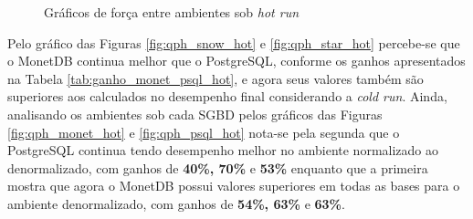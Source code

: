 \begin{figure}[t]
        \centering
        \caption{Gráficos de força entre ambientes sob \textit{hot run}}
        \label{fig:power_hot}
\end{figure}

Pelo gráfico das Figuras \ref{fig:qph_snow_hot} e \ref{fig:qph_star_hot} percebe-se que o MonetDB continua melhor que o PostgreSQL, conforme os ganhos apresentados na Tabela \ref{tab:ganho_monet_psql_hot}, e agora seus valores também são superiores aos calculados no desempenho final considerando a \textit{cold run}. Ainda, analisando os ambientes sob cada SGBD pelos gráficos das Figuras \ref{fig:qph_monet_hot} e \ref{fig:qph_psql_hot} nota-se pela segunda que o PostgreSQL continua tendo desempenho melhor no ambiente normalizado ao denormalizado, com ganhos de \textbf{40\%, 70\%} e \textbf{53\%} enquanto que a primeira mostra que agora o MonetDB possui valores superiores em todas as bases para o ambiente denormalizado, com ganhos de \textbf{54\%, 63\%} e \textbf{63\%}.

